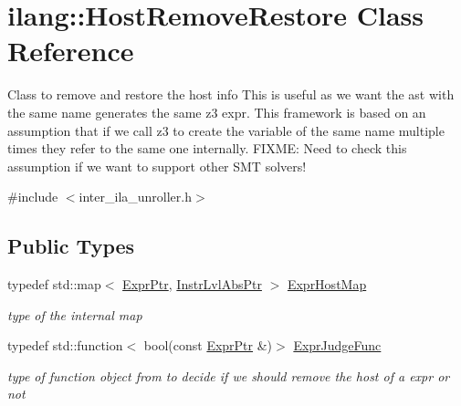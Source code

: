 \hypertarget{classilang_1_1_host_remove_restore}{}\section{ilang\+:\+:Host\+Remove\+Restore Class Reference}
\label{classilang_1_1_host_remove_restore}


Class to remove and restore the host info This is useful as we want the ast with the same name generates the same z3 expr. This framework is based on an assumption that if we call z3 to create the variable of the same name multiple times they refer to the same one internally. F\+I\+X\+ME\+: Need to check this assumption if we want to support other S\+MT solvers!  




{\ttfamily \#include $<$inter\+\_\+ila\+\_\+unroller.\+h$>$}

\subsection*{Public Types}
\begin{DoxyCompactItemize}
\item 
\mbox{\label{classilang_1_1_host_remove_restore_af0c048ec7148a9b3fa8bbfa84bb8727e}} 
typedef std\+::map$<$ \mbox{\hyperlink{namespaceilang_a7c4196c72e53ea4df4b7861af7bc3bce}{Expr\+Ptr}}, \mbox{\hyperlink{namespaceilang_ad1b30fdf347e493b3937143da05d1a72}{Instr\+Lvl\+Abs\+Ptr}} $>$ \mbox{\hyperlink{classilang_1_1_host_remove_restore_af0c048ec7148a9b3fa8bbfa84bb8727e}{Expr\+Host\+Map}}
\begin{DoxyCompactList}\small\item\em type of the internal map \end{DoxyCompactList}\item 
\mbox{\label{classilang_1_1_host_remove_restore_ad6fe1a90d3e53376a4a4564bb36a4eb5}} 
typedef std\+::function$<$ bool(const \mbox{\hyperlink{namespaceilang_a7c4196c72e53ea4df4b7861af7bc3bce}{Expr\+Ptr}} \&)$>$ \mbox{\hyperlink{classilang_1_1_host_remove_restore_ad6fe1a90d3e53376a4a4564bb36a4eb5}{Expr\+Judge\+Func}}
\begin{DoxyCompactList}\small\item\em type of function object from to decide if we should remove the host of a expr or not \end{DoxyCompactList}\end{DoxyCompactItemize}
